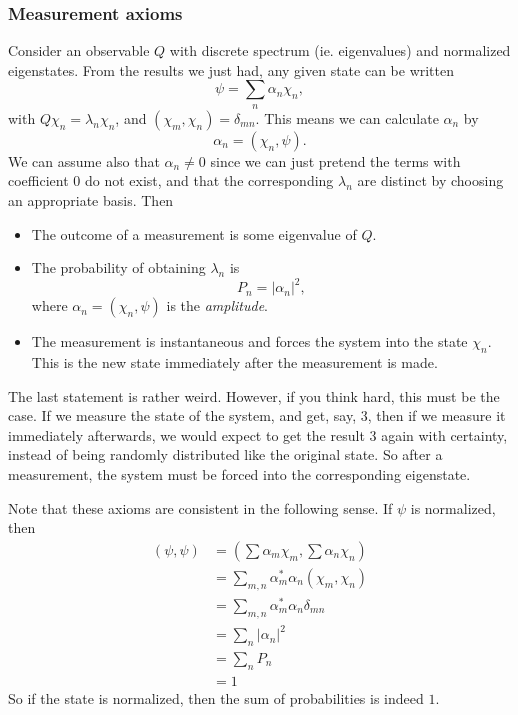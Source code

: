\documentclass[a4paper]{article}
\begin{document}
\subsubsection*{Measurement axioms}
Consider an observable $Q$ with discrete spectrum (ie. eigenvalues) and normalized eigenstates. From the results we just had, any given state can be written
\[
  \psi = \sum_n \alpha_n \chi_n,
\]
with $Q\chi_n = \lambda_n \chi_n$, and $(\chi_m, \chi_n) = \delta_{mn}$. This means we can calculate $\alpha_n$ by
\[
  \alpha_n = (\chi_n, \psi).
\]
We can assume also that $\alpha_n \not= 0$ since we can just pretend the terms with coefficient $0$ do not exist, and that the corresponding $\lambda_n$ are distinct by choosing an appropriate basis. Then
\begin{itemize}
  \item The outcome of a measurement is some eigenvalue of $Q$.
  \item The probability of obtaining $\lambda_n$ is
    \[
      P_n = |\alpha_n|^2,
    \]
    where $\alpha_n = (\chi_n, \psi)$ is the \emph{amplitude}.
  \item The measurement is instantaneous and forces the system into the state $\chi_n$. This is the new state immediately after the measurement is made.
\end{itemize}
The last statement is rather weird. However, if you think hard, this must be the case. If we measure the state of the system, and get, say, $3$, then if we measure it immediately afterwards, we would expect to get the result $3$ again with certainty, instead of being randomly distributed like the original state. So after a measurement, the system must be forced into the corresponding eigenstate.

Note that these axioms are consistent in the following sense. If $\psi$ is normalized, then
\begin{align*}
  (\psi, \psi) &= \left(\sum \alpha_m \chi_m, \sum \alpha_n \chi_n\right)\\
  &= \sum_{m, n} \alpha_m^* \alpha_n (\chi_m, \chi_n)\\
  &= \sum_{m, n} \alpha_m^* \alpha_n \delta_{mn}\\
  &= \sum_n |\alpha_n|^2\\
  &= \sum_n P_n\\
  &= 1
\end{align*}
So if the state is normalized, then the sum of probabilities is indeed $1$.
\end{document}
